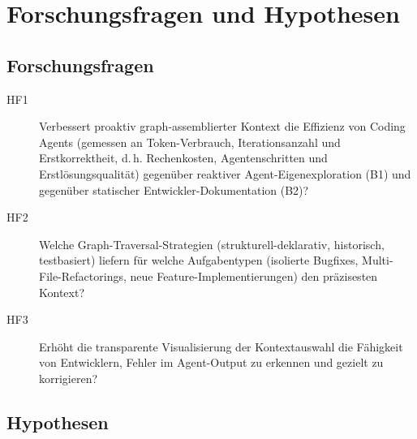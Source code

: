 \section{Forschungsfragen und Hypothesen}

\subsection*{Forschungsfragen}

\begin{description}
  \item[HF1] Verbessert proaktiv graph-assemblierter Kontext die Effizienz von Coding Agents (gemessen an Token-Verbrauch, Iterationsanzahl und Erstkorrektheit, d.\,h. Rechenkosten, Agentenschritten und Erstlösungsqualität) gegenüber reaktiver Agent-Eigenexploration (B1) und gegenüber statischer Entwickler-Dokumentation (B2)?

  \item[HF2] Welche Graph-Traversal-Strategien (strukturell-deklarativ, historisch, testbasiert) liefern für welche Aufgabentypen (isolierte Bugfixes, Multi-File-Refactorings, neue Feature-Implementierungen) den präzisesten Kontext?

  \item[HF3] Erhöht die transparente Visualisierung der Kontextauswahl die Fähigkeit von Entwicklern, Fehler im Agent-Output zu erkennen und gezielt zu korrigieren?
\end{description}

\subsection*{Hypothesen}

